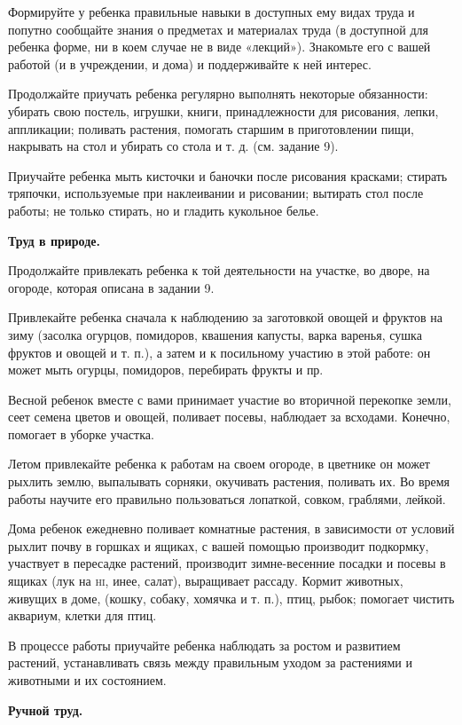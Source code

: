\documentclass{book}
\begin{document}
Формируйте у ребенка правильные навыки в доступных ему видах труда и
попутно сообщайте знания о предметах и материалах труда (в доступной для
ребенка форме, ни в коем случае не в виде «лекций»). Знакомьте его с
вашей работой (и в учреждении, и дома) и поддерживайте к ней интерес.

Продолжайте приучать ребенка регулярно выполнять некоторые обязанности:
убирать свою постель, игрушки, книги, принадлежности для рисования,
лепки, аппликации; поливать растения, помогать старшим в приготовлении
пищи, накрывать на стол и убирать со стола и т. д. (см. задание 9).

Приучайте ребенка мыть кисточки и баночки после рисования красками;
стирать тряпочки, используемые при наклеивании и рисовании; вытирать
стол после работы; не только стирать, но и гладить кукольное белье.

\textbf{Труд в природе.}

Продолжайте привлекать ребенка к той деятельности на участке, во дворе,
на огороде, которая описана в задании 9.

Привлекайте ребенка сначала к наблюдению за заготовкой овощей и фруктов
на зиму (засолка огурцов, помидоров, квашения капусты, варка варенья,
сушка фруктов и овощей и т. п.), а затем и к посильному участию в этой
работе: он может мыть огурцы, помидоров, перебирать фрукты и пр.

Весной ребенок вместе с вами принимает участие во вторичной перекопке
земли, сеет семена цветов и овощей, поливает посевы, наблюдает за
всходами. Конечно, помогает в уборке участка.

Летом привлекайте ребенка к работам на своем огороде, в цветнике он
может рыхлить землю, выпалывать сорняки, окучивать растения, поливать
их. Во время работы научите его правильно пользоваться лопаткой, совком,
граблями, лейкой.

Дома ребенок ежедневно поливает комнатные растения, в зависимости от
условий рыхлит почву в горшках и ящиках, с вашей помощью производит
подкормку, участвует в пересадке растений, производит зимне-весенние
посадки и посевы в ящиках (лук на \textsc{hi,} инее, салат), выращивает
рассаду. Кормит животных, живущих в доме, (кошку, собаку, хомячка и т.
п.), птиц, рыбок; помогает чистить аквариум, клетки для птиц.

В процессе работы приучайте ребенка наблюдать за ростом и развитием
растений, устанавливать связь между правильным уходом за растениями и
животными и их состоянием.

\textbf{Ручной труд.}
\end{document}
